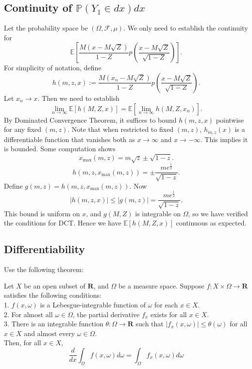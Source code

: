 
\subsection{Continuity of $\mathbb{P}(Y_1 \in dx)dx$}

Let the probability space be $(\Omega, \mathcal{F}, \mu)$. We only need to establish the continuity for
\[
	\mathbb{E}\left[\frac{M(x-M \sqrt{Z})}{1-Z} p\left(\frac{x-M \sqrt{Z}}{\sqrt{1-Z}}\right)\right]
.\] 
For simplicity of notation, define
\[
	h(m, z, x) := \frac{M(x_n-M \sqrt{Z})}{1-Z} p\left(\frac{x-M \sqrt{Z}}{\sqrt{1-Z}}\right)
.\] 
Let $x_n \to x$. Then we need to establish
\[
	\lim_{n \to  \infty } \mathbb{E}\left[h(M, Z, x)\right]=
	 \mathbb{E}\left[\lim_{n \to  \infty } h(M, Z, x_n)\right]
.\]
By Dominated Convergence Theorem, it suffices to bound $h(m, z, x)$ pointwise for any fixed $(m, z)$. Note that when restricted to fixed $(m, z)$, $h_{m, z}(x)$ is a differentiable function that vanishes both as $x \to \infty $ and $x \to -\infty $. This implies it is bounded. Some computation shows
\[
	x_{\max}(m, z) = m \sqrt{z} \pm \sqrt{1 - z} 
.\] 
\[
	h(m, z, x_{\max}(m, z)) = \pm \frac{m e^{\frac{1}{2}}}{\sqrt{1-z} }
.\] 
Define $g(m, z) = h(m, z, x_{\max}(m, z))$. Now
\[
	\left| h(m, z, x) \right| \le \left| g(m, z) \right| = \frac{ m e^{\frac{1}{2}}}{\sqrt{1-z} }
.\] 
This bound is uniform on $x$, and $g(M, Z)$ is integrable on $\Omega$, so we have verified the conditions for DCT. Hence we have $\mathbb{E}[h(M, Z, x)]$ continuous as expected.

\subsection{Differentiability}

Use the following theorem:

\begin{theorem}
	Let $X$ be an open subset of $\mathbf{R}$, and $\Omega$ be a measure space. Suppose $f: X \times \Omega \rightarrow \mathbf{R}$ satisfies the following conditions:\\
	1. $f(x, \omega)$ is a Lebesgue-integrable function of $\omega$ for each $x \in X$.\\
2. For almost all $\omega \in \Omega$, the partial derivative $f_x$ exists for all $x \in X$.\\
3. There is an integrable function $\theta: \Omega \rightarrow \mathbf{R}$ such that $\left|f_x(x, \omega)\right| \leq \theta(\omega)$ for all $x \in X$ and almost every $\omega \in \Omega$.\\
Then, for all $x \in X$,
\[
\frac{d}{d x} \int_{\Omega} f(x, \omega) d \omega=\int_{\Omega} f_x(x, \omega) d \omega
\]
\end{theorem}

